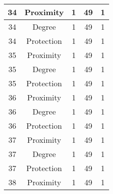 \documentclass[results.tex]{subfiles}
\begin{document}
\begin{center}
\begin{tabular}{| c || c | c | c | c |}
            \hline
            34                      & Proximity                    & 1                      & 49                      & 1                    \\
            \hline
            34                      & Degree                       & 1                      & 49                      & 1                    \\
            \hline
            34                      & Protection                   & 1                      & 49                      & 1                    \\
            \hline
            35                      & Proximity                    & 1                      & 49                      & 1                    \\
            \hline
            35                      & Degree                       & 1                      & 49                      & 1                    \\
            \hline
            35                      & Protection                   & 1                      & 49                      & 1                    \\
            \hline
            36                      & Proximity                    & 1                      & 49                      & 1                    \\
            \hline
            36                      & Degree                       & 1                      & 49                      & 1                    \\
            \hline
            36                      & Protection                   & 1                      & 49                      & 1                    \\
            \hline
            37                      & Proximity                    & 1                      & 49                      & 1                    \\
            \hline
            37                      & Degree                       & 1                      & 49                      & 1                    \\
            \hline
            37                      & Protection                   & 1                      & 49                      & 1                    \\
            \hline
            38                      & Proximity                    & 1                      & 49                      & 1                    \\

\end{tabular}
\end{center}
\end{document}
